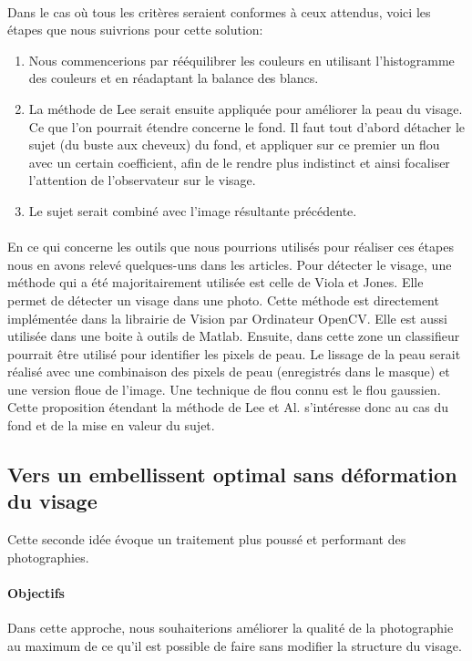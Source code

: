 \documentclass[11pt, french,screen]{report-rd-info}
\begin{document}
\paragraph{}
Dans le cas où tous les critères seraient conformes à ceux attendus, voici les étapes que nous suivrions pour cette solution:
\begin{enumerate}
\item Nous commencerions par rééquilibrer les couleurs en utilisant l’histogramme des couleurs et en réadaptant la balance des blancs.
\item La méthode de Lee serait ensuite appliquée pour améliorer la peau du visage. Ce que l’on pourrait étendre concerne le fond. Il faut tout d’abord détacher le sujet (du buste aux cheveux) du fond, et appliquer sur ce premier un flou avec un certain coefficient, afin de le rendre plus indistinct et ainsi focaliser l’attention de l’observateur sur le visage.
\item Le sujet serait combiné avec l’image résultante précédente.
\end{enumerate}
\paragraph{}
En ce qui concerne les outils que nous pourrions utilisés pour réaliser ces étapes nous en avons relevé quelques-uns dans les articles. Pour détecter le visage, une méthode qui a été majoritairement utilisée est celle de Viola et Jones. Elle permet de détecter un visage dans une photo. Cette méthode est directement implémentée dans la librairie de Vision par Ordinateur OpenCV. Elle est aussi utilisée dans une boite à outils de Matlab. Ensuite, dans cette zone un classifieur pourrait être utilisé pour identifier les pixels de peau.
Le lissage de la peau serait réalisé avec une combinaison des pixels de peau (enregistrés dans le masque) et une version floue de l’image. Une technique de flou connu est le flou gaussien.
Cette proposition étendant la méthode de Lee et Al. s’intéresse donc au cas du fond et de la mise en valeur du sujet.
\subsection{Vers un embellissent optimal sans déformation du visage}
\label{propdeux}
Cette seconde idée évoque un traitement plus poussé et performant des photographies.
\paragraph{Objectifs}
Dans cette approche, nous souhaiterions améliorer la qualité de la photographie au maximum de ce qu’il est possible de faire sans modifier la structure du visage.
\end{document}
